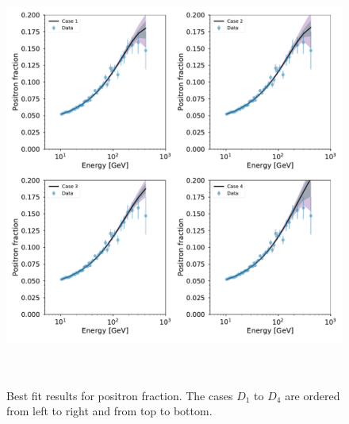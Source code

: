 \documentclass[a4paper,11pt]{article}
\begin{document}
\begin{figure}[htb]
\begin{center}
\includegraphics[height=14cm,width=14cm,angle=0]{Figures/pymultinest_fit_case_5_ep_fraction.pdf}
\caption{Best fit results for positron fraction. The cases $D_1$ to $D_4$ are ordered from left to right and from top to bottom.}
\label{fig:bf-positron-fraction-spectrum}
\end{center}
\end{figure}
\end{document}
